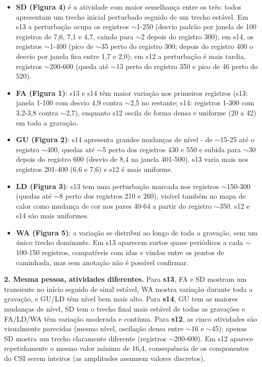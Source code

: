 \begin{itemize}
    \item \textbf{SD (Figura 4)} é a atividade com maior semelhança entre os três: todos apresentam um trecho inicial perturbado seguido de um trecho estável. Em s13 a perturbação ocupa os registros $\sim$1-250 (desvio padrão por janela de 100 registros de 7,6, 7,1 e 4,7, caindo para $\sim$2 depois do registro 300); em s14, os registros $\sim$1-400 (pico de $\sim$35 perto do registro 300; depois do registro 400 o desvio por janela fica entre 1,7 e 2,0); em s12 a perturbação é mais tardia, registros $\sim$200-600 (queda até $\sim$13 perto do registro 350 e pico de 46 perto do 520).
    \item \textbf{FA (Figura 1)}: s13 e s14 têm maior variação nos primeiros registros (s13: janela 1-100 com desvio 4,9 contra $\sim$2,5 no restante; s14: registros 1-300 com 3,2-3,8 contra $\sim$2,7), enquanto s12 oscila de forma densa e uniforme (20 a 42) em toda a gravação.
    \item \textbf{GU (Figura 2)}: s14 apresenta grandes mudanças de nível - de $\sim$15-25 até o registro $\sim$400, quedas até $\sim$5 perto dos registros 430 e 550 e subida para $\sim$30 depois do registro 600 (desvio de 8,4 na janela 401-500). s13 varia mais nos registros 201-400 (6,6 e 7,6) e s12 é mais uniforme.
    \item \textbf{LD (Figura 3)}: s13 tem uma perturbação marcada nos registros $\sim$150-300 (quedas até $\sim$8 perto dos registros 210 e 260), visível também no mapa de calor como mudança de cor nos pares 40-64 a partir do registro $\sim$350. s12 e s14 são mais uniformes.
    \item \textbf{WA (Figura 5)}: a variação se distribui ao longo de toda a gravação, sem um único trecho dominante. Em s13 aparecem surtos quase periódicos a cada $\sim$100-150 registros, compatíveis com idas e vindas entre os pontos de caminhada, mas sem anotação não é possível confirmar.
\end{itemize}
\textbf{2. Mesma pessoa, atividades diferentes.} Para \textbf{s13}, FA e SD mostram um transiente no início seguido de sinal estável, WA mostra variação durante toda a gravação, e GU/LD têm nível bem mais alto. Para \textbf{s14}, GU tem as maiores mudanças de nível, SD tem o trecho final mais estável de todas as gravações e FA/LD/WA têm variação moderada e contínua. Para \textbf{s12}, as cinco atividades são visualmente parecidas (mesmo nível, oscilação densa entre $\sim$16 e $\sim$45); apenas SD mostra um trecho claramente diferente (registros $\sim$200-600). Em s12 aparece repetidamente o mesmo valor mínimo de 16,4, consequência de os componentes do CSI serem inteiros (as amplitudes assumem valores discretos).

